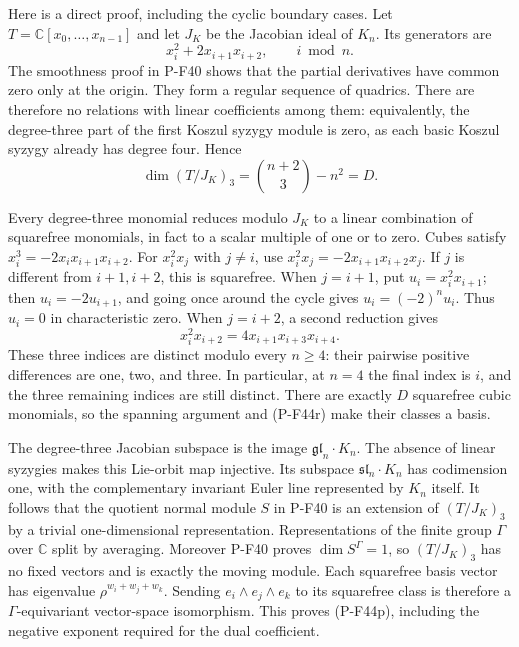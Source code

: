 Here is a direct proof, including the cyclic boundary cases.
Let $T=\mathbb C[x_0,\ldots,x_{n-1}]$ and let $J_K$ be the
Jacobian ideal of $K_n$. Its generators are
\[
                 x_i^2+2x_{i+1}x_{i+2},
                         \qquad i\bmod n.
 \tag{P-F44q}
\]
The smoothness proof in P-F40 shows that the partial
derivatives have common zero only at the origin.
They form a regular sequence of quadrics. There are
therefore no relations with linear coefficients among
them: equivalently, the degree-three part of the first
Koszul syzygy module is zero, as each basic Koszul
syzygy already has degree four. Hence
\[
                    \dim(T/J_K)_3
                       =\binom{n+2}{3}-n^2=D.
 \tag{P-F44r}
\]

Every degree-three monomial reduces modulo $J_K$ to a
linear combination of squarefree monomials, in fact to
a scalar multiple of one or to zero. Cubes satisfy
$x_i^3=-2x_ix_{i+1}x_{i+2}$.
For $x_i^2x_j$ with $j\ne i$, use
$x_i^2x_j=-2x_{i+1}x_{i+2}x_j$.
If $j$ is different from $i+1,i+2$, this is squarefree.
When $j=i+1$, put $u_i=x_i^2x_{i+1}$; then
$u_i=-2u_{i+1}$, and going once around the cycle gives
$u_i=(-2)^n u_i$. Thus $u_i=0$ in characteristic zero.
When $j=i+2$, a second reduction gives
\[
                  x_i^2x_{i+2}
                     =4x_{i+1}x_{i+3}x_{i+4}.
 \tag{P-F44s}
\]
These three indices are distinct modulo every $n\ge4$:
their pairwise positive differences are one, two, and
three. In particular, at $n=4$ the final index is $i$,
and the three remaining indices are still distinct.
There are exactly $D$ squarefree cubic monomials, so
the spanning argument and (P-F44r) make their classes
a basis.

The degree-three Jacobian subspace is the image
$\mathfrak{gl}_n\cdot K_n$.
The absence of linear syzygies makes this Lie-orbit
map injective. Its subspace
$\mathfrak{sl}_n\cdot K_n$ has codimension one, with
the complementary invariant Euler line represented
by $K_n$ itself.
It follows that the quotient normal module $S$ in
P-F40 is an extension of $(T/J_K)_3$ by a trivial
one-dimensional representation.
Representations of the finite group $\Gamma$ over
$\mathbb C$ split by averaging.
Moreover P-F40 proves $\dim S^\Gamma=1$, so
$(T/J_K)_3$ has no fixed vectors and is exactly the
moving module.
Each squarefree basis vector has eigenvalue
$\rho^{w_i+w_j+w_k}$. Sending
$e_i\wedge e_j\wedge e_k$ to its squarefree class is
therefore a $\Gamma$-equivariant vector-space
isomorphism. This proves (P-F44p), including the
negative exponent required for the dual coefficient.

